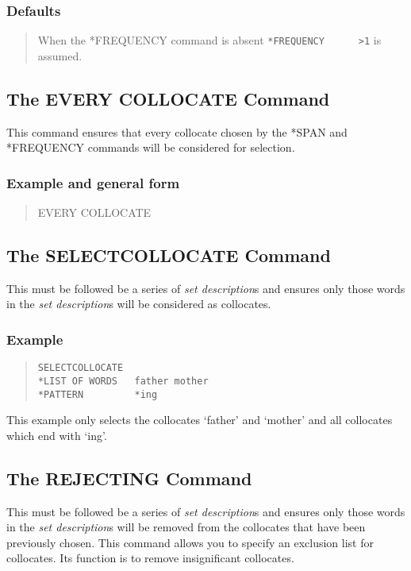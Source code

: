 \subsubsection{Defaults}
\begin{quote}
When the *FREQUENCY command is absent \verb/*FREQUENCY      >1/ is assumed.
\end{quote}

\subsection{The EVERY COLLOCATE Command}
This command ensures that every collocate chosen by the *SPAN and *FREQUENCY
commands will be considered for selection.

\subsubsection{Example and general form}
\begin{quote}
EVERY COLLOCATE
\end{quote}

\subsection{The SELECTCOLLOCATE Command}
This must be followed be a series of {\em set description}s and ensures
only those words in the {\em set description}s will be considered
as collocates.

\subsubsection{Example}
\begin{quote}
\begin{verbatim}
SELECTCOLLOCATE
*LIST OF WORDS   father mother
*PATTERN         *ing
\end{verbatim}
\end{quote}
This example only selects the collocates `father' and `mother' and all
collocates which end with `ing'.

\subsection{The REJECTING Command}
This must be followed be a series of {\em set description}s and ensures
only those words in the {\em set description}s will be removed from
the collocates that have been previously chosen.
This command allows you to specify an exclusion list for
collocates.  Its function is to remove insignificant collocates.

